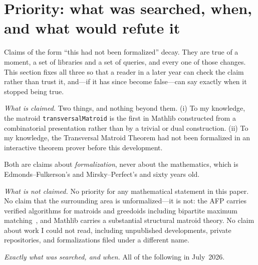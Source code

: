 \documentclass[11pt]{article}
\newcommand{\lean}[1]{\texttt{#1}}
\begin{document}
\section{Priority: what was searched, when, and what would refute it}\label{sec:priority}

Claims of the form ``this had not been formalized'' decay. They are true of a moment, a set of
libraries and a set of queries, and every one of those changes. This section fixes all three so
that a reader in a later year can check the claim rather than trust it, and---if it has since
become false---can say exactly when it stopped being true.

{\sloppy\emph{What is claimed.} Two things, and nothing beyond them. (i) To my knowledge, the
matroid \lean{transversalMatroid} is the first in Mathlib constructed from a combinatorial
presentation rather than by a trivial or dual construction. (ii) To my knowledge, the Transversal
Matroid Theorem had not been formalized in an interactive theorem prover before this development.\par}
Both are claims about \emph{formalization}, never about the mathematics, which is
Edmonds--Fulkerson's and Mirsky--Perfect's and sixty years old.

\emph{What is not claimed.} No priority for any mathematical statement in this paper. No claim
that the surrounding area is unformalized---it is not: the AFP carries verified algorithms for
matroids and greedoids including bipartite maximum matching~\cite{itp2025}, and Mathlib carries a
substantial structural matroid theory. No claim about work I could not read, including unpublished
developments, private repositories, and formalizations filed under a different name.

\emph{Exactly what was searched, and when.} All of the following in July~2026.
\end{document}
